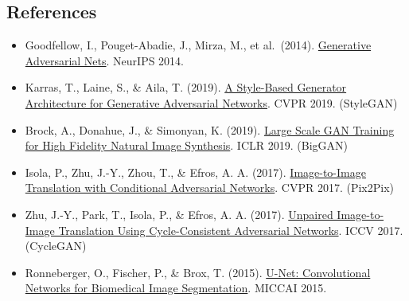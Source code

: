 \FloatBarrier
{}
\hypertarget{references-38}{%
\subsection{References}\label{references-38}}

\vspace{0.25em}
\begin{itemize}
\tightlist
\item
  Goodfellow, I., Pouget-Abadie, J., Mirza, M., et al.~(2014). \href{https://papers.nips.cc/paper/5423-generative-adversarial-nets}{Generative Adversarial Nets}. NeurIPS 2014.
\item
  Karras, T., Laine, S., \& Aila, T. (2019). \href{https://openaccess.thecvf.com/content_CVPR_2019/html/Karras_A_Style-Based_Generator_Architecture_for_Generative_Adversarial_Networks_CVPR_2019_paper.html}{A Style-Based Generator Architecture for Generative Adversarial Networks}. CVPR 2019. (StyleGAN)
\item
  Brock, A., Donahue, J., \& Simonyan, K. (2019). \href{https://arxiv.org/abs/1809.11096}{Large Scale GAN Training for High Fidelity Natural Image Synthesis}. ICLR 2019. (BigGAN)
\item
  Isola, P., Zhu, J.-Y., Zhou, T., \& Efros, A. A. (2017). \href{https://openaccess.thecvf.com/content_cvpr_2017/html/Isola_Image-To-Image_Translation_With_CVPR_2017_paper.html}{Image-to-Image Translation with Conditional Adversarial Networks}. CVPR 2017. (Pix2Pix)
\item
  Zhu, J.-Y., Park, T., Isola, P., \& Efros, A. A. (2017). \href{https://openaccess.thecvf.com/content_iccv_2017/html/Zhu_Unpaired_Image-To-Image_Translation_ICCV_2017_paper.html}{Unpaired Image-to-Image Translation Using Cycle-Consistent Adversarial Networks}. ICCV 2017. (CycleGAN)
\item
  Ronneberger, O., Fischer, P., \& Brox, T. (2015). \href{https://arxiv.org/abs/1505.04597}{U-Net: Convolutional Networks for Biomedical Image Segmentation}. MICCAI 2015.
\end{itemize}

\clearpage
